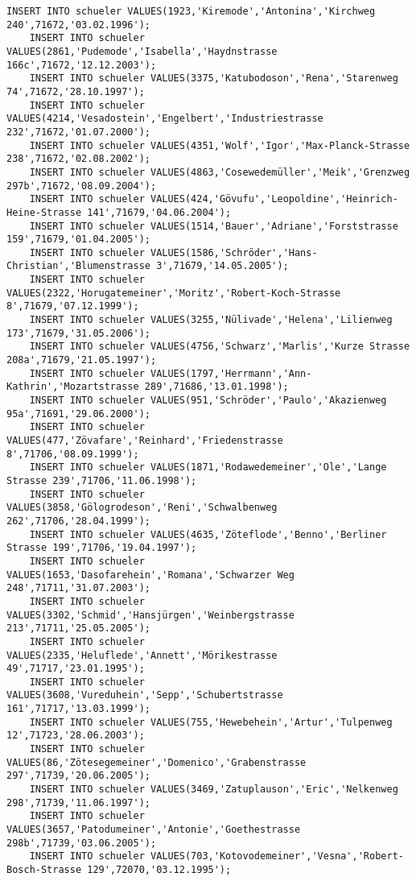 \begin{lstlisting}[breaklines=True, numbers=none, basicstyle=\tiny, keepspaces=false]
	INSERT INTO schueler VALUES(1923,'Kiremode','Antonina','Kirchweg 240',71672,'03.02.1996');
	INSERT INTO schueler VALUES(2861,'Pudemode','Isabella','Haydnstrasse 166c',71672,'12.12.2003');
	INSERT INTO schueler VALUES(3375,'Katubodoson','Rena','Starenweg 74',71672,'28.10.1997');
	INSERT INTO schueler VALUES(4214,'Vesadostein','Engelbert','Industriestrasse 232',71672,'01.07.2000');
	INSERT INTO schueler VALUES(4351,'Wolf','Igor','Max-Planck-Strasse 238',71672,'02.08.2002');
	INSERT INTO schueler VALUES(4863,'Cosewedemüller','Meik','Grenzweg 297b',71672,'08.09.2004');
	INSERT INTO schueler VALUES(424,'Gövufu','Leopoldine','Heinrich-Heine-Strasse 141',71679,'04.06.2004');
	INSERT INTO schueler VALUES(1514,'Bauer','Adriane','Forststrasse 159',71679,'01.04.2005');
	INSERT INTO schueler VALUES(1586,'Schröder','Hans-Christian','Blumenstrasse 3',71679,'14.05.2005');
	INSERT INTO schueler VALUES(2322,'Horugatemeiner','Moritz','Robert-Koch-Strasse 8',71679,'07.12.1999');
	INSERT INTO schueler VALUES(3255,'Nülivade','Helena','Lilienweg 173',71679,'31.05.2006');
	INSERT INTO schueler VALUES(4756,'Schwarz','Marlis','Kurze Strasse 208a',71679,'21.05.1997');
	INSERT INTO schueler VALUES(1797,'Herrmann','Ann-Kathrin','Mozartstrasse 289',71686,'13.01.1998');
	INSERT INTO schueler VALUES(951,'Schröder','Paulo','Akazienweg 95a',71691,'29.06.2000');
	INSERT INTO schueler VALUES(477,'Zövafare','Reinhard','Friedenstrasse 8',71706,'08.09.1999');
	INSERT INTO schueler VALUES(1871,'Rodawedemeiner','Ole','Lange Strasse 239',71706,'11.06.1998');
	INSERT INTO schueler VALUES(3858,'Gölogrodeson','Reni','Schwalbenweg 262',71706,'28.04.1999');
	INSERT INTO schueler VALUES(4635,'Zöteflode','Benno','Berliner Strasse 199',71706,'19.04.1997');
	INSERT INTO schueler VALUES(1653,'Dasofarehein','Romana','Schwarzer Weg 248',71711,'31.07.2003');
	INSERT INTO schueler VALUES(3302,'Schmid','Hansjürgen','Weinbergstrasse 213',71711,'25.05.2005');
	INSERT INTO schueler VALUES(2335,'Heluflede','Annett','Mörikestrasse 49',71717,'23.01.1995');
	INSERT INTO schueler VALUES(3608,'Vureduhein','Sepp','Schubertstrasse 161',71717,'13.03.1999');
	INSERT INTO schueler VALUES(755,'Hewebehein','Artur','Tulpenweg 12',71723,'28.06.2003');
	INSERT INTO schueler VALUES(86,'Zötesegemeiner','Domenico','Grabenstrasse 297',71739,'20.06.2005');
	INSERT INTO schueler VALUES(3469,'Zatuplauson','Eric','Nelkenweg 298',71739,'11.06.1997');
	INSERT INTO schueler VALUES(3657,'Patodumeiner','Antonie','Goethestrasse 298b',71739,'03.06.2005');
	INSERT INTO schueler VALUES(703,'Kotovodemeiner','Vesna','Robert-Bosch-Strasse 129',72070,'03.12.1995');

\end{lstlisting}
